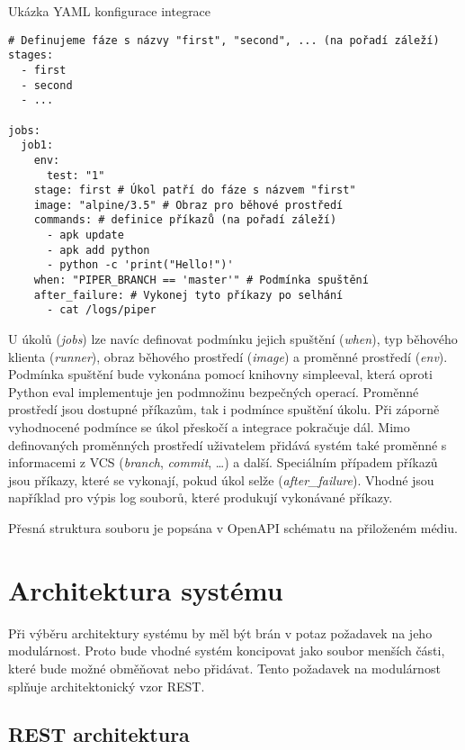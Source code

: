 \begin{listing}[ht]
\caption{\label{code:piper-yml-example}Ukázka YAML konfigurace integrace}
\begin{verbatim}
# Definujeme fáze s názvy "first", "second", ... (na pořadí záleží)
stages:
  - first
  - second
  - ...

jobs:
  job1:
    env:
      test: "1"
    stage: first # Úkol patří do fáze s názvem "first"
    image: "alpine/3.5" # Obraz pro běhové prostředí
    commands: # definice příkazů (na pořadí záleží)
      - apk update
      - apk add python
      - python -c 'print("Hello!")'
    when: "PIPER_BRANCH == 'master'" # Podmínka spuštění
    after_failure: # Vykonej tyto příkazy po selhání
      - cat /logs/piper
\end{verbatim}
\end{listing}

U úkolů (\textit{jobs}) lze navíc definovat podmínku jejich spuštění (\textit{when}), typ běhového klienta (\textit{runner}), obraz běhového prostředí (\textit{image}) a proměnné prostředí (\textit{env}).
Podmínka spuštění bude vykonána pomocí knihovny simpleeval, která oproti Python eval implementuje jen podmnožinu bezpečných operací.
Proměnné prostředí jsou dostupné příkazům, tak i podmínce spuštění úkolu.
Při záporně vyhodnocené podmínce se úkol přeskočí a integrace pokračuje dál.
Mimo definovaných proměnných prostředí uživatelem přidává systém také proměnné s informacemi z VCS (\textit{branch}, \textit{commit}, \ldots) a další.
Speciálním případem příkazů jsou příkazy, které se vykonají, pokud úkol selže (\textit{after\_failure}).
Vhodné jsou například pro výpis log souborů, které produkují vykonávané příkazy.

Přesná struktura souboru je popsána v OpenAPI schématu na přiloženém médiu.

\section{Architektura systému}

Při výběru architektury systému by měl být brán v potaz požadavek na jeho modulárnost.
Proto bude vhodné systém koncipovat jako soubor menších části, které bude možné obměňovat nebo přidávat.
Tento požadavek na modulárnost splňuje architektonický vzor REST.

\subsection{REST architektura}

